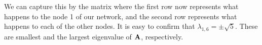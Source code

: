 We can capture this by the matrix
where the first row now represents what happens to the node 1 of our network, and the second row represents what happens to each of the other nodes. It is easy to confirm that $\lambda_{1,6} = \pm \sqrt{5}$. These are smallest and the largest eigenvalue of $\bf A$, respectively.   













